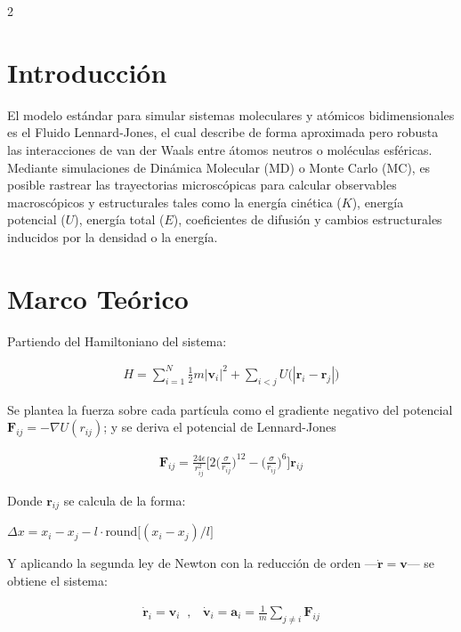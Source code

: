 \begin{multicols}{2}

\section*{Introducción}

    El modelo estándar para simular sistemas moleculares y atómicos bidimensionales es el Fluido Lennard-Jones, el cual describe de forma aproximada pero robusta las interacciones de van der Waals entre átomos neutros o moléculas esféricas. Mediante simulaciones de Dinámica Molecular (MD) o Monte Carlo (MC), es posible rastrear las trayectorias microscópicas para calcular observables macroscópicos y estructurales tales como la energía cinética ($K$), energía potencial ($U$), energía total ($E$), coeficientes de difusión y cambios estructurales inducidos por la densidad o la energía.

    


\section*{Marco Teórico}

    Partiendo del Hamiltoniano del sistema:

    \begin{align*}
        H = \sum_{i=1}^{N} \frac{1}{2} m |\mathbf{v}_i|^2 + \sum_{i<j} U\big(|\mathbf{r}_i - \mathbf{r}_j|\big)
    \end{align*}

    Se plantea la fuerza sobre cada partícula como el gradiente negativo del potencial $\mathbf{F}_{ij} = -\nabla U(r_{ij})$; y se deriva el potencial de Lennard-Jones

    \begin{align*}
        \mathbf{F}_{ij} = \frac{24 \epsilon}{r_{ij}^2} \Bigg[ 2\Bigg(\frac{\sigma}{r_{ij}}\Bigg)^{12} - \Bigg(\frac{\sigma}{r_{ij}}\Bigg)^{6} \Bigg] \mathbf{r}_{ij}
    \end{align*}

    Donde $\mathbf{r}_{ij}$ se calcula de la forma:

    $\Delta x = x_i - x_j - l \cdot \text{round}\big[(x_i - x_j)/l\big]$

    Y aplicando la segunda ley de Newton con la reducción de orden ---$\dot{\mathbf{r}} = \mathbf{v}$--- se obtiene el sistema:

    \begin{align*}
        \dot{\mathbf{r}}_i = \mathbf{v}_i \; \; , \hspace{10pt} \dot{\mathbf{v}}_i = \mathbf{a}_i = \frac{1}{m}\sum_{j \neq i} \mathbf{F}_{ij}
    \end{align*}


\end{multicols}
